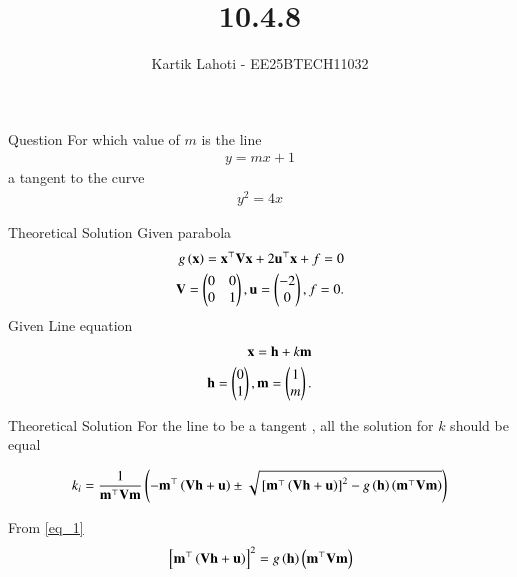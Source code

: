 \documentclass{beamer}
\title %
{10.4.8}
\author 
{Kartik Lahoti - EE25BTECH11032}
\begin{document}
\frame{\titlepage}
\begin{frame}{Question}
For which value of $m$ is the line
\begin{align}
    y = mx + 1
\end{align}
a tangent to the curve 
\begin{align}
    y^2 = 4x
\end{align}

\end{frame}

\begin{frame}{Theoretical Solution}
Given parabola 
\begin{align}
    g\left(\mathbf{x}\right) = \mathbf{x}^{\top}\mathbf{V}\mathbf{x} + 2\mathbf{u}^{\top}\mathbf{x} + f = 0 \\
    \mathbf{V} = \begin{pmatrix}0&0\\0&1\end{pmatrix} , \mathbf{u} = \begin{pmatrix}-2\\0\end{pmatrix} , f = 0.
\end{align}
Given Line equation
\begin{align}
    \mathbf{x} = \mathbf{h} + k\mathbf{m}\\
    \mathbf{h} = \begin{pmatrix}0\\1\end{pmatrix} , \mathbf{m} = \begin{pmatrix}1 \\ m\end{pmatrix}.
\end{align}
\end{frame}

\begin{frame}{Theoretical Solution}
For the line to be a tangent , all the solution for $k$ should be equal

\begin{align}
    k_i = \frac{1}{\mathbf{m}^{\top}\mathbf{V}\mathbf{m}}\left(-\mathbf{m}^{\top}\left(\mathbf{V}\mathbf{h}+\mathbf{u}\right) \pm \sqrt{{}\left[\mathbf{m}^{\top}\left(\mathbf{V}\mathbf{h}+\mathbf{u}\right)\right]^2-g\left(\mathbf{h}\right)\left(\mathbf{m}^{\top}\mathbf{V}\mathbf{m}\right)}\right) \label{eq_1}
\end{align}

From \ref{eq_1} 
\begin{align}
    {}\left[\mathbf{m}^{\top}\left(\mathbf{V}\mathbf{h}+\mathbf{u}\right)\right]^2 = g\left(\mathbf{h}\right)\left(\mathbf{m}^{\top}\mathbf{V}\mathbf{m}\right) \label{eq_3}
\end{align}
\end{frame}
\end{document}
